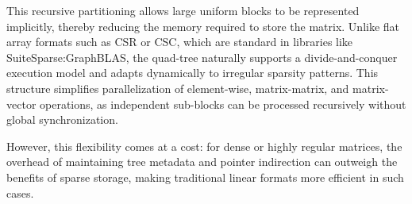\begin{figure}[htbp]
\begin{subfigure}[b]{0.9\textwidth}
\label{fig:quadtree_tree}
\end{subfigure}
\label{fig:quadtree_example}
\end{figure}



This recursive partitioning allows large uniform blocks to be represented implicitly, thereby reducing the memory required to store the matrix.
Unlike flat array formats such as CSR or CSC, which are standard in libraries like SuiteSparse:GraphBLAS, the quad-tree naturally supports a divide-and-conquer execution model and adapts dynamically to irregular sparsity patterns.
This structure simplifies parallelization of element-wise, matrix-matrix, and matrix-vector operations, as independent sub-blocks can be processed recursively without global synchronization.

However, this flexibility comes at a cost: for dense or highly regular matrices, the overhead of maintaining tree metadata and pointer indirection can outweigh the benefits of sparse storage, making traditional linear formats more efficient in such cases.


